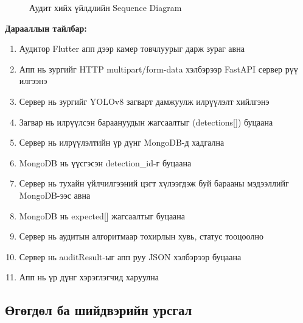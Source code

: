 \begin{figure}[H]
{
}
\caption{Аудит хийх үйлдлийн Sequence Diagram}
\label{fig:sequence_diagram}
\end{figure}

\textbf{Дарааллын тайлбар:}
\begin{enumerate}
    \item Аудитор Flutter апп дээр камер товчлуурыг дарж зураг авна
    \item Апп нь зургийг HTTP multipart/form-data хэлбэрээр FastAPI сервер рүү илгээнэ
    \item Сервер нь зургийг YOLOv8 загварт дамжуулж илрүүлэлт хийлгэнэ
    \item Загвар нь илрүүлсэн бараануудын жагсаалтыг (detections[]) буцаана
    \item Сервер нь илрүүлэлтийн үр дүнг MongoDB-д хадгална
    \item MongoDB нь үүсгэсэн detection\_id-г буцаана
    \item Сервер нь тухайн үйлчилгээний цэгт хүлээгдэж буй барааны мэдээллийг MongoDB-ээс авна
    \item MongoDB нь expected[] жагсаалтыг буцаана
    \item Сервер нь аудитын алгоритмаар тохирлын хувь, статус тооцоолно
    \item Сервер нь auditResult-ыг апп руу JSON хэлбэрээр буцаана
    \item Апп нь үр дүнг хэрэглэгчид харуулна
\end{enumerate}

\subsection{Өгөгдөл ба шийдвэрийн урсгал}

